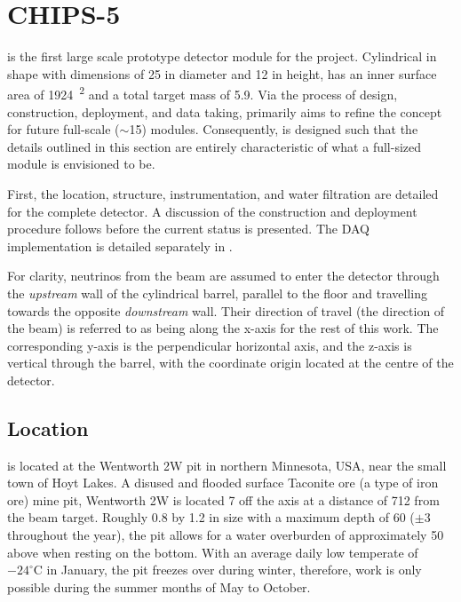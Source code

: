 \section{CHIPS-5} %
\label{sec:chips_detector} %

\chipsfive is the first large scale prototype detector module for the \chips project. Cylindrical
in shape with dimensions of \SI{25}{} in diameter and \SI{12}{} in height,
\chipsfive has an inner surface area of \SI{1924}{^2} and a total target mass of
\SI{5.9}{}. Via the process of design, construction, deployment, and data taking,
\chipsfive primarily aims to refine the \chips concept for future full-scale
($\sim$\SI{15}{}) modules. Consequently, \chipsfive is designed such that the details
outlined in this section are entirely characteristic of what a full-sized \chips module is
envisioned to be.

First, the location, structure, instrumentation, and water filtration are detailed for the
complete detector. A discussion of the construction and deployment procedure follows before the
current status is presented. The \chipsfive DAQ implementation is detailed separately in
.

For clarity, neutrinos from the \numi beam are assumed to enter the \chipsfive detector through
the \emph{upstream} wall of the cylindrical barrel, parallel to the floor and travelling towards
the opposite \emph{downstream} wall. Their direction of travel (the direction of the beam) is
referred to as being along the x-axis for the rest of this work. The corresponding y-axis is the
perpendicular horizontal axis, and the z-axis is vertical through the barrel, with the coordinate
origin located at the centre of the detector.

\subsection{Location} %
\label{sec:chips_detector_location} %

\chipsfive is located at the Wentworth 2W pit in northern Minnesota, USA, near the small town of
Hoyt Lakes. A disused and flooded surface Taconite ore (a type of iron ore) mine pit, Wentworth 2W
is located \SI{7}{} off the \numi axis at a distance of \SI{712}{} from the
beam target. Roughly \SI{0.8}{} by \SI{1.2}{} in size with a maximum depth of
\SI{60}{} ($\pm$\SI{3}{} throughout the year), the pit allows for a water
overburden of approximately \SI{50}{} above \chipsfive when resting on the bottom. With an
average daily low temperate of $-24^{\circ}\text{C}$ in January, the pit freezes over during
winter, therefore, work is only possible during the summer months of May to October.

